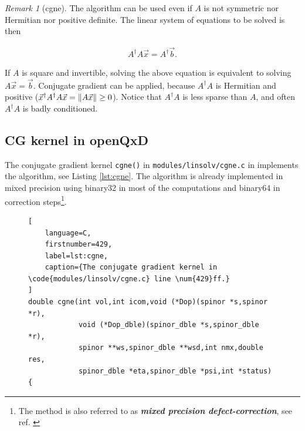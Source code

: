 \documentclass{article}
\theoremstyle{plain} %
\theoremstyle{convention} %
\theoremstyle{remark} %
\newtheorem*{remark}{Remark} %
\def\code#1{\texttt{#1}}
\def\df#1{\textbf{\textit{#1}}}
\numberwithin{equation}{section}
\begin{document}
\begin{remark}[\acrfull{cgne}]
    The algorithm can be used even if $A$ is not symmetric nor Hermitian nor positive definite. The linear system of equations to be solved is then

    \begin{align*}
        A^{\dagger} A \vec{x} = A^{\dagger} \vec{b}.
    \end{align*}

    If $A$ is square and invertible, solving the above equation is equivalent to solving $A \vec{x} = \vec{b}$. Conjugate gradient can be applied, because $A^{\dagger} A$ is Hermitian and positive ($\vec{x}^{\dagger} A^{\dagger} A \vec{x} = \norm{A \vec{x}} \ge 0$). Notice that $A^{\dagger} A$ is less sparse than $A$, and often $A^{\dagger} A$ is badly conditioned.

\end{remark}

\subsection{CG kernel in openQxD}

\label{sec:fp_in_openqxd}

The conjugate gradient kernel \code{cgne()} in \code{modules/linsolv/cgne.c} in \cite{openqxd} implements the algorithm, see Listing \ref{lst:cgne}. The algorithm is already implemented in mixed precision using \gls{binary32} in most of the computations and \gls{binary64} in correction steps\footnote{The method is also referred to as \df{mixed precision defect-correction}, see ref. \cite{goddeke2005}}.

\begin{figure} %
\begin{lstlisting}[
    language=C,
    firstnumber=429,
    label=lst:cgne,
    caption={The conjugate gradient kernel in \code{modules/linsolv/cgne.c} line \num{429}ff.}
]
double cgne(int vol,int icom,void (*Dop)(spinor *s,spinor *r),
            void (*Dop_dble)(spinor_dble *s,spinor_dble *r),
            spinor **ws,spinor_dble **wsd,int nmx,double res,
            spinor_dble *eta,spinor_dble *psi,int *status)
{
\end{lstlisting}
\end{figure} 
\end{document}
